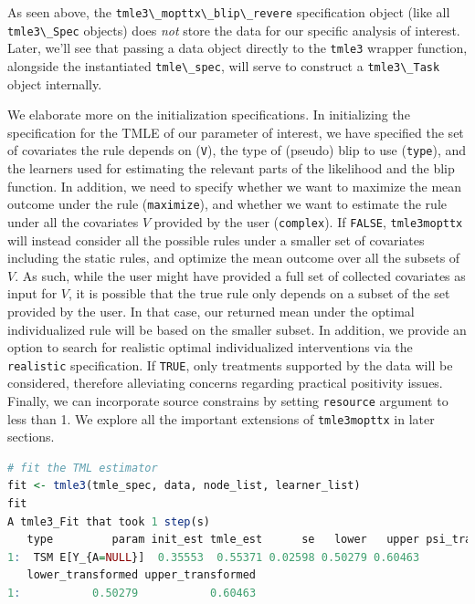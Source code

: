 \documentclass[
  12pt, krantz2,
]{krantz}
\newcommand{\passthrough}[1]{#1}
\newcommand{\1}{\mathbbm{1}}
\theoremstyle{definition}
\theoremstyle{definition}
\theoremstyle{definition}
\theoremstyle{definition}
\theoremstyle{remark}
\begin{document}
As seen above, the \passthrough{\lstinline!tmle3\_mopttx\_blip\_revere!} specification object
(like all \passthrough{\lstinline!tmle3\_Spec!} objects) does \emph{not} store the data for our
specific analysis of interest. Later,
we'll see that passing a data object directly to the \passthrough{\lstinline!tmle3!} wrapper function,
alongside the instantiated \passthrough{\lstinline!tmle\_spec!}, will serve to construct a \passthrough{\lstinline!tmle3\_Task!}
object internally.

We elaborate more on the initialization specifications. In initializing the
specification for the TMLE of our parameter of interest, we have specified the
set of covariates the rule depends on (\passthrough{\lstinline!V!}), the type of (pseudo) blip to use
(\passthrough{\lstinline!type!}), and the learners used for estimating the relevant parts of the
likelihood and the blip function. In addition, we need to specify whether we
want to maximize the mean outcome under the rule (\passthrough{\lstinline!maximize!}), and whether we
want to estimate the rule under all the covariates \(V\) provided by the user
(\passthrough{\lstinline!complex!}). If \passthrough{\lstinline!FALSE!}, \passthrough{\lstinline!tmle3mopttx!} will instead consider all the possible
rules under a smaller set of covariates including the static rules, and optimize
the mean outcome over all the subsets of \(V\). As such, while the user might have
provided a full set of collected covariates as input for \(V\), it is possible
that the true rule only depends on a subset of the set provided by the user. In
that case, our returned mean under the optimal individualized rule will be based
on the smaller subset. In addition, we provide an option to search for realistic
optimal individualized interventions via the \passthrough{\lstinline!realistic!} specification. If
\passthrough{\lstinline!TRUE!}, only treatments supported by the data will be considered, therefore
alleviating concerns regarding practical positivity issues. Finally, we can incorporate
source constrains by setting \passthrough{\lstinline!resource!} argument to less than 1. We explore all the
important extensions of \passthrough{\lstinline!tmle3mopttx!} in later sections.

\begin{lstlisting}[language=R]
# fit the TML estimator
fit <- tmle3(tmle_spec, data, node_list, learner_list)
fit
A tmle3_Fit that took 1 step(s)
   type         param init_est tmle_est      se   lower   upper psi_transformed
1:  TSM E[Y_{A=NULL}]  0.35553  0.55371 0.02598 0.50279 0.60463         0.55371
   lower_transformed upper_transformed
1:           0.50279           0.60463
\end{lstlisting}
\end{document}
